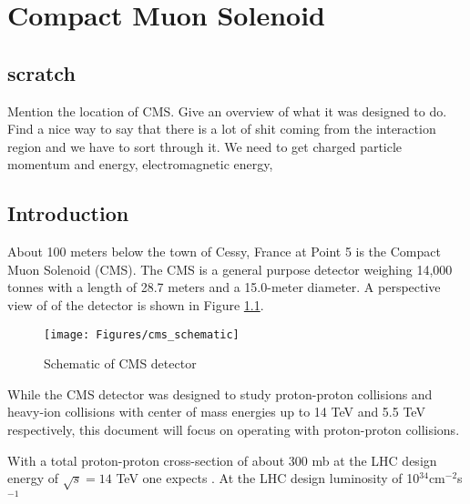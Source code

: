 \chapter{Compact Muon Solenoid}

\section{scratch}
Mention the location of CMS.  Give an overview of what it was designed to do.  Find a nice way to say that there is a lot of shit coming from the interaction region and we have to sort through it.  We need to get charged particle momentum and energy, electromagnetic energy, 

\section{Introduction}
About 100 meters below the town of Cessy, France at Point 5 is the Compact Muon Solenoid (CMS).  The CMS is a general purpose detector weighing 14,000 tonnes with a length of 28.7 meters and a 15.0-meter diameter.  A perspective view of of the detector is shown in Figure \ref{fig:cmsschematic}.
\begin{figure}[h]
	\centering
	\texttt{[image: Figures/cms\_schematic]}
	\caption{Schematic of CMS detector}
	\label{fig:cmsschematic}
\end{figure}


While the CMS detector was designed to study proton-proton collisions and heavy-ion collisions with center of mass energies up to 14 TeV and 5.5 TeV respectively, this document will focus on operating with proton-proton collisions. 

With a total proton-proton cross-section of about 300 mb at the LHC design energy of $\sqrt{s} = 14$ TeV one expects \cite{Collaboration_2008}.  At the LHC design luminosity of 10$^{34}$cm$^{-2}$s$^{-1}$
